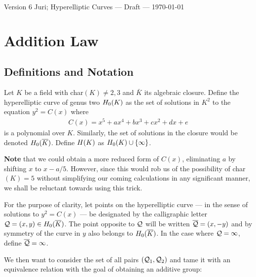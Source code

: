 \documentclass[english,11pt,a4paper]{article}
\begin{document}



\newpage

Version 6 \scriptsize \hfill Juri; Hyperelliptic Curves --- Draft --- \today
\normalsize

\section{Addition Law}\label{ch1}

\subsection{Definitions and Notation}

\begin{defin}
  Let $K$ be a field with char$(K) \neq 2, 3$ and $\bar K$ its algebraic closure. Define the hyperelliptic curve of genus two $H_0(K)$ as the set of solutions in $K^2$ to the equation $y^2=C(x)$ where
  \begin{align*}
    C(x)=x^5+ax^4+bx^3+cx^2+dx+e
  \end{align*}
  is a polynomial over $K$. Similarly, the set of solutions in the closure would be denoted $H_0(\overline K)$.  Define $H(K)$ as $H_0(K) \cup \{ \infty \}$.

  \textbf{Note} that we could obtain a more reduced form of $C(x)$, eliminating $a$ by shifting $x$ to $x-a/5$. However, since this would rob us of the possibility of char$(K) = 5$ without simplifying our coming calculations in any significant manner, we shall be reluctant towards using this trick.

  For the purpose of clarity, let points on the hyperelliptic curve --- in the sense of solutions to $y^2=C(x)$ --- be designated by the calligraphic letter $\mathcal{Q}=(x,y) \in H_0(\overline K)$. The point opposite to $\mathcal{Q}$ will be written $\overline {\mathcal{Q}} = (x,-y)$ and by symmetry of the curve in $y$ also belongs to $H_0(\overline K)$. In the case where $\mathcal{Q} = \infty$, define $\overline {\mathcal{Q}} = \infty$.

  We then want to consider the set of all pairs $(\mathcal{Q}_1,\mathcal{Q}_2)$ and tame it with an equivalence relation with the goal of obtaining an additive group:
\end{defin}
\end{document}
